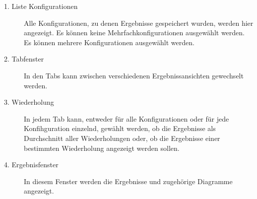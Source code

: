 \begin{description}

\item[1. Liste Konfigurationen] Alle Konfigurationen, zu denen Ergebnisse gespeichert wurden, werden hier angezeigt. Es können keine Mehrfachkonfigurationen ausgewählt werden. Es können mehrere Konfigurationen ausgewählt werden.

\item[2. Tabfenster] In den Tabs kann zwischen verschiedenen Ergebnissansichten gewechselt werden.

\item[3. Wiederholung] In jedem Tab kann, entweder für alle Konfigurationen oder für jede Konfihguration einzelnd, gewählt werden, ob die Ergebnisse als Durchschnitt aller Wiederholungen oder, ob die Ergebnisse einer bestimmten Wiederholung angezeigt werden sollen.

\item[4. Ergebnisfenster] In diesem Fenster werden die Ergebnisse und zugehörige Diagramme angezeigt.

\end{description}



